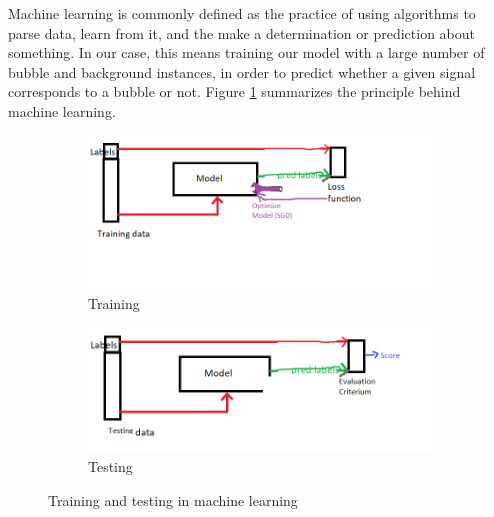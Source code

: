 		Machine learning is commonly defined as the practice of using algorithms to parse data, learn from it, and the make a determination or prediction about something. In our case, this means training our model with a large number of bubble and background instances, in order to predict whether a given signal corresponds to a bubble or not. Figure \ref{fig:machine_learning_intro} summarizes the principle behind machine learning. 
		
		\begin{figure}
			\centering
			\begin{subfigure}[b]{0.55\textwidth}
				\includegraphics[scale=1]{images/training_intro.png}
				\caption{Training}
			\end{subfigure}
			\begin{subfigure}[b]{0.55\textwidth}
				\includegraphics[scale=1]{images/testing_intro.png}
				\caption{Testing}
			\end{subfigure}
			\caption{Training and testing in machine learning}
			\label{fig:machine_learning_intro}
		\end{figure}				
		
		
